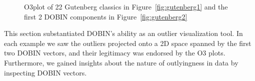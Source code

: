 \documentclass[a4paper,11pt]{article}
\begin{document}
\begin{figure}[!ht]
	\centering
	\caption{O3plot of 22 Gutenberg classics in Figure~\ref{fig:gutenberg1} and the first 2 DOBIN components in Figure~\ref{fig:gutenberg2} }
	\label{fig:gutenberg}
\end{figure}

This section substantiated DOBIN's ability as an outlier visualization tool. In each example we saw the outliers projected onto a 2D space spanned by the first two DOBIN vectors, and their legitimacy was endorsed by the O3 plots. Furthermore, we gained insights about the nature of  outlyingness in data by inspecting  DOBIN vectors.
\end{document}
